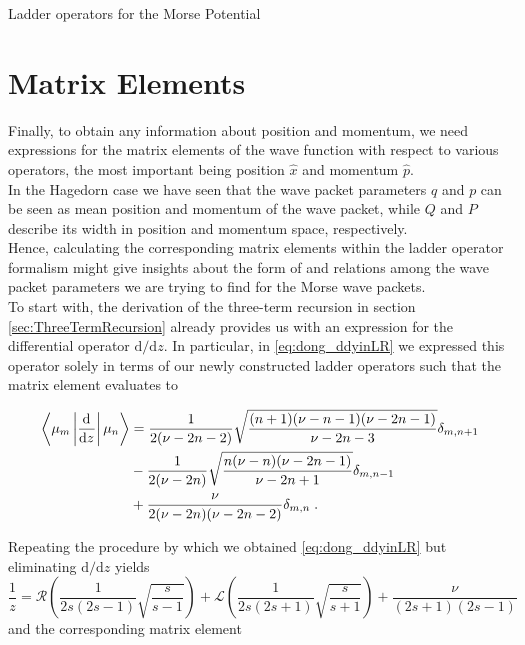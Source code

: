 \begin{chapter}{Ladder operators for the Morse Potential}

\section{Matrix Elements} %
\label{sec:Matrix Elements}
Finally, to obtain any information about position and momentum, we need expressions for the matrix elements of the wave function with respect to various operators, the most important being position $\hat{x}$ and momentum $\hat{p}$.\\

In the Hagedorn case we have seen that the wave packet parameters $q$ and $p$ can be seen as mean position and momentum of the wave packet, while
$Q$ and $P$ describe its width in position and momentum space, respectively.\\

Hence, calculating the corresponding matrix elements within the ladder operator
formalism might give insights about the form of and relations among the wave packet parameters we are trying to find for the Morse wave packets.\\

To start with, the derivation of the three-term recursion in section \ref{sec:ThreeTermRecursion} already provides us with an expression for
the differential operator $\mathrm{d}/\mathrm{d}z$. In particular, in \eqref{eq:dong_ddyinLR} we expressed this operator solely in terms of
our newly constructed ladder operators such that the matrix element evaluates to

\begin{align}
    \begin{split}
	\left\langle \mu_m\left|\frac{\mathrm{d}^{}}{\mathrm{d}z^{}}\right|\mu_n \right\rangle &= \frac{1}{2(\nu-2n-2)}\sqrt{\frac{(n+1)(\nu-n-1)(\nu-2n-1)}{\nu-2n-3}}\delta_{m,n+1}\\
	&-\frac{1}{2(\nu-2n)}\sqrt{\frac{n(\nu-n)(\nu-2n-1)}{\nu-2n+1}}\delta_{m,n-1}\\
	&+\frac{\nu}{2(\nu-2n)(\nu-2n-2)}\delta_{m,n}\; .
    \end{split}
\end{align}

Repeating the procedure by which we obtained \eqref{eq:dong_ddyinLR} but eliminating $\mathrm{d}/\mathrm{d}z$ yields
\begin{equation}
    \label{eq:dong_1overyinLR}
    \frac{1}{z}=\mathcal{R}\left(\frac{1}{2s(2s-1)}\sqrt{\frac{s}{s-1}}\right)+\mathcal{L}\left(\frac{1}{2s(2s+1)}\sqrt{\frac{s}{s+1}}\right)
    +\frac{\nu}{(2s+1)(2s-1)}
\end{equation}
and the corresponding matrix element


\end{chapter}
